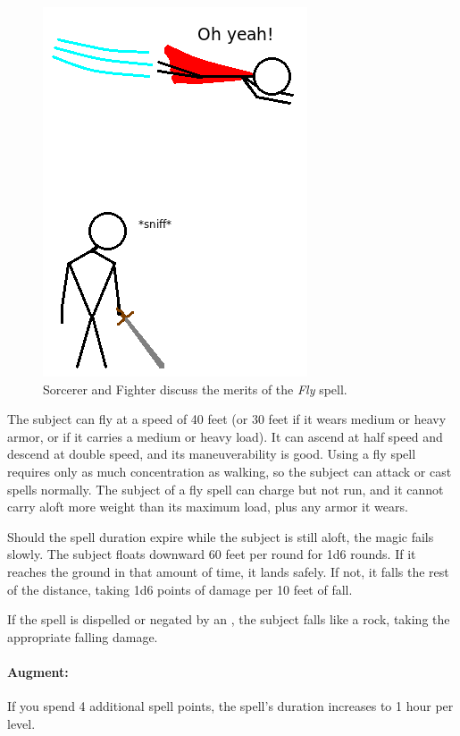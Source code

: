 \begin{figure}
  \caption{Sorcerer and Fighter discuss the merits of the \emph{Fly} spell.}
  \centering
    \includegraphics{Pics/Fly.png}
\end{figure}

The subject can fly at a speed of 40 feet (or 30 feet if it wears medium or heavy armor, or if it carries a medium or heavy load). 
It can ascend at half speed and descend at double speed, and its maneuverability is good. 
Using a fly spell requires only as much concentration as walking, so the subject can attack or cast spells normally. 
The subject of a fly spell can charge but not run, and it cannot carry aloft more weight than its maximum load, plus any armor it wears.

Should the spell duration expire while the subject is still aloft, the magic fails slowly. 
The subject floats downward 60 feet per round for 1d6 rounds. 
If it reaches the ground in that amount of time, it lands safely. 
If not, it falls the rest of the distance, taking 1d6 points of damage per 10 feet of fall. 

If the spell is dispelled or negated by an , 
the subject falls like a rock, taking the appropriate falling damage.

\paragraph{Augment:} If you spend 4 additional spell points, the spell's duration increases to 1 hour per level.

